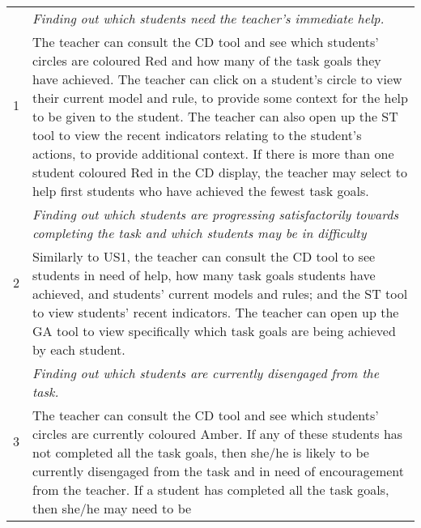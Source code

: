 \begin{table}[htbp]
  \begin{tabular}{|p{0.5cm}|p{12.5cm}|}
  \hline \multirow{2}{*}{1} & \emph{Finding out which students need
    the teacher's immediate help.} \\
  \cline{2-2} & The teacher can consult the CD tool and see which
  students' circles are coloured Red and how many of the task goals
  they have achieved. The teacher can click on a student's circle to 
  view their current model and rule, to provide some context for the 
  help to be given to the student.
  The teacher can also open up the ST tool to view the
  recent indicators relating to the student's actions, to provide
  additional context. If there is more than one student coloured Red
  in the CD display, the teacher may select to help first students who
  have achieved the fewest task goals. \\
  \hline \multirow{2}{*}{2} & \emph{Finding out which students are
    progressing satisfactorily towards completing the task and which
    students may be in difficulty} \\
  \cline{2-2} 
  & Similarly to US1, the teacher can consult the CD tool to see
  students in need of help, how many task goals students have achieved,
  and students' current models and rules; and the ST tool to
  view students' recent indicators. 
  The teacher can open up the GA tool to view specifically
  which task goals are being achieved by each student. 
  \\
  \hline \multirow{2}{*}{3} & \emph{Finding out which students are
    currently disengaged from the task.} \\
  \cline{2-2} 
  & The teacher can consult the CD tool and see which students'
  circles are currently coloured Amber. If any of these students
  has not completed all the task goals, then she/he is likely 
  to be currently disengaged
  from the task and in need of encouragement from the teacher. If a
  student has completed all the task goals, then she/he may need to be

\end{tabular}
\end{table}
